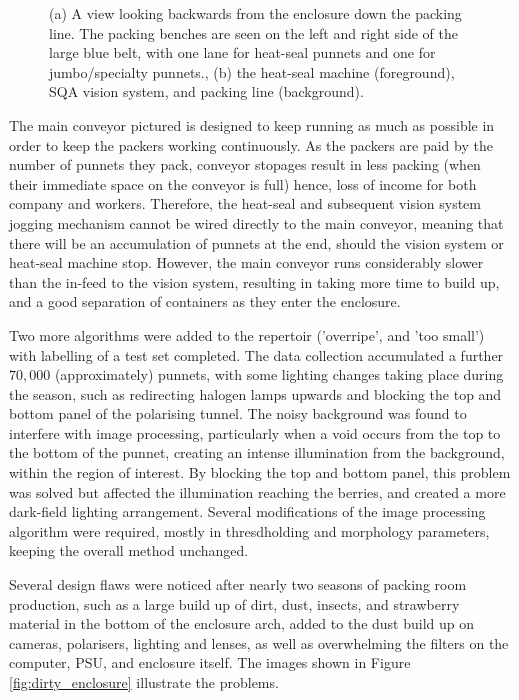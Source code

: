 \documentclass[fleqn,twoside]{article}
\begin{document}
\begin{figure}[ht]
\begin{subfigure}{.35\textwidth}
		\caption{}
		\label{fig:myponga_system_line}
	\end{subfigure}%
	
	\caption{(a) A view looking backwards from the enclosure down the packing line. The packing benches are seen on the left and right side of the large blue belt, with one lane for heat-seal punnets and one for jumbo/specialty punnets., (b) the heat-seal machine (foreground), SQA vision system, and packing line (background).}
	\label{}
\end{figure}

The main conveyor pictured is designed to keep running as much as possible in order to keep the packers working continuously. As the packers are paid by the number of punnets they pack, conveyor stopages result in less packing (when their immediate space on the conveyor is full) hence, loss of income for both company and workers. Therefore, the heat-seal and subsequent vision system jogging mechanism cannot be wired directly to the main conveyor, meaning that there will be an accumulation of punnets at the end, should the vision system or heat-seal machine stop. However, the main conveyor runs considerably slower than the in-feed to the vision system, resulting in taking more time to build up, and a good separation of containers as they enter the enclosure.

Two more algorithms were added to the repertoir ('overripe', and 'too small') with labelling of a test set completed. The data collection accumulated a further $70,000$ (approximately) punnets, with some lighting changes taking place during the season, such as redirecting halogen lamps upwards and blocking the top and bottom panel of the polarising tunnel. The noisy background was found to interfere with image processing, particularly when a void occurs from the top to the bottom of the punnet, creating an intense illumination from the background, within the region of interest. By blocking the top and bottom panel, this problem was solved but affected the illumination reaching the berries, and created a more dark-field lighting arrangement. Several modifications of the image processing algorithm were required, mostly in thresdholding and morphology parameters, keeping the overall method unchanged. 

Several design flaws were noticed after nearly two seasons of packing room production, such as a large build up of dirt, dust, insects, and strawberry material in the bottom of the enclosure arch, added to the dust build up on cameras, polarisers, lighting and lenses, as well as overwhelming the filters on the computer, PSU, and enclosure itself. The images shown in Figure \ref{fig:dirty_enclosure} illustrate the problems.
\end{document}
